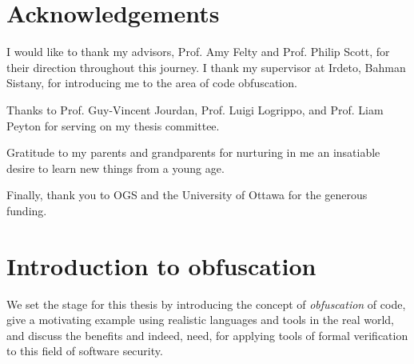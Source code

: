 \documentclass[12pt,notitlepage]{report}
\theoremstyle{plain}
\theoremstyle{definition}
\newcommand{\define}[1]{\emph{#1}\index{#1}}
\numberwithin{equation}{section}
\begin{document}
\chapter*{Acknowledgements}
I would like to thank my advisors, Prof. Amy Felty and Prof. Philip Scott,  for their direction throughout this journey.  I thank my supervisor at Irdeto, Bahman Sistany, for introducing me to the area of code obfuscation.  
\par Thanks to Prof. Guy-Vincent Jourdan, Prof. Luigi Logrippo, and Prof. Liam Peyton for serving on my thesis committee.
\par Gratitude to my parents and grandparents for nurturing in me an insatiable desire to learn new things from a young age.
\par Finally, thank you to OGS and the University of Ottawa for the generous funding.



\newpage


\tableofcontents

\chapter{Introduction to obfuscation}\label{intro}

We set the stage for this thesis by introducing the concept of \define{obfuscation} of code, give a motivating example using realistic languages and tools in the real world, and discuss the benefits and indeed, need, for applying tools of formal verification to this field of software security.

\renewcommand{\thepage}{\arabic{page}}
\setcounter{page}{1}
\renewcommand*\theenumi{\alph{enumi}}
\renewcommand*\labelenumi{(\theenumi)}
\end{document}

